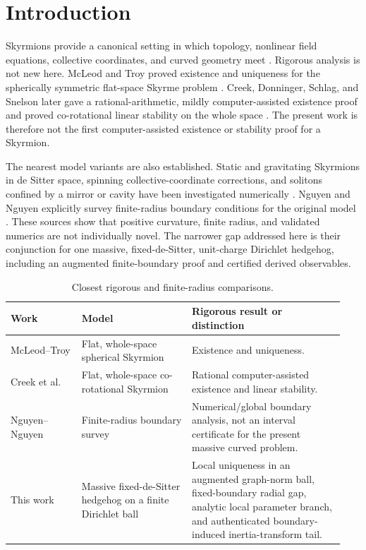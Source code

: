 \section{Introduction}
\label{sec:introduction}

Skyrmions provide a canonical setting in which topology, nonlinear field
equations, collective coordinates, and curved geometry meet
\cite{skyrme1961,manton2004}.  Rigorous analysis is not new here.  McLeod and
Troy proved existence and uniqueness for the spherically symmetric flat-space
Skyrme problem \cite{mcleodtroy1991}.  Creek, Donninger, Schlag, and Snelson
later gave a rational-arithmetic, mildly computer-assisted existence proof and
proved co-rotational linear stability on the whole space
\cite{creek2016}.  The present work is therefore not the first
computer-assisted existence or stability proof for a Skyrmion.

The nearest model variants are also established.  Static and gravitating
Skyrmions in de Sitter space, spinning collective-coordinate corrections, and
solitons confined by a mirror or cavity have been investigated numerically
\cite{brihaye2006,hata2010,giacomini2018}.  Nguyen and Nguyen explicitly survey
finite-radius boundary conditions for the original model
\cite{nguyen2013}.  These sources show that positive curvature, finite radius,
and validated numerics are not individually novel.  The narrower gap addressed
here is their conjunction for one massive, fixed-de-Sitter, unit-charge
Dirichlet hedgehog, including an augmented finite-boundary proof and certified
derived observables.

\begin{table}[ht]
  \centering
  \small
  \begin{tabular}{@{}p{0.20\linewidth}p{0.31\linewidth}p{0.43\linewidth}@{}}
    \toprule
    \raggedright Work & \raggedright Model &
    \raggedright Rigorous result or distinction \tabularnewline
    \midrule
    \raggedright McLeod--Troy \cite{mcleodtroy1991} &
    \raggedright Flat, whole-space spherical Skyrmion &
    \raggedright Existence and uniqueness. \tabularnewline
    \raggedright Creek et al.\ \cite{creek2016} &
    \raggedright Flat, whole-space co-rotational Skyrmion &
    \raggedright Rational computer-assisted existence and linear stability.
    \tabularnewline
    \raggedright Nguyen--Nguyen \cite{nguyen2013} &
    \raggedright Finite-radius boundary survey &
    \raggedright Numerical/global boundary analysis, not an interval
    certificate for the present massive curved problem. \tabularnewline
    \raggedright This work &
    \raggedright Massive fixed-de-Sitter hedgehog on a finite Dirichlet ball &
    \raggedright Local uniqueness in an augmented graph-norm ball,
    fixed-boundary radial gap, analytic local parameter branch, and
    authenticated boundary-induced inertia-transform tail. \tabularnewline
    \bottomrule
  \end{tabular}
  \caption{Closest rigorous and finite-radius comparisons.}
  \label{tab:prior-comparison}
\end{table}

